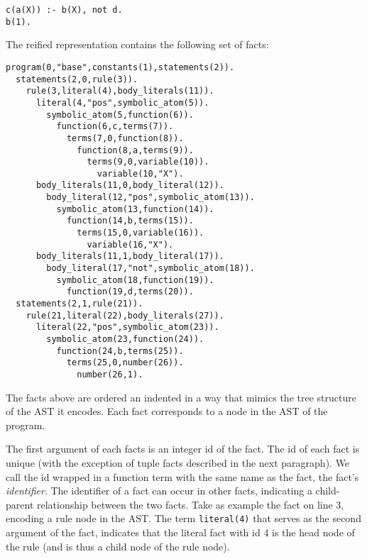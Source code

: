 \begin{lstlisting}[language=clingo]
c(a(X)) :- b(X), not d. 
b(1).
\end{lstlisting}

The reified representation contains the following set of facts:

\begin{lstlisting}[language=clingo]
program(0,"base",constants(1),statements(2)).
  statements(2,0,rule(3)).
    rule(3,literal(4),body_literals(11)).
      literal(4,"pos",symbolic_atom(5)).
        symbolic_atom(5,function(6)).
          function(6,c,terms(7)).
            terms(7,0,function(8)).
              function(8,a,terms(9)).
                terms(9,0,variable(10)).
                  variable(10,"X").
      body_literals(11,0,body_literal(12)).
        body_literal(12,"pos",symbolic_atom(13)).
          symbolic_atom(13,function(14)).
            function(14,b,terms(15)).
              terms(15,0,variable(16)).
                variable(16,"X").
      body_literals(11,1,body_literal(17)).
        body_literal(17,"not",symbolic_atom(18)).
          symbolic_atom(18,function(19)).
            function(19,d,terms(20)).
  statements(2,1,rule(21)).
    rule(21,literal(22),body_literals(27)).
      literal(22,"pos",symbolic_atom(23)).
        symbolic_atom(23,function(24)).
          function(24,b,terms(25)).
            terms(25,0,number(26)).
              number(26,1).
\end{lstlisting}

The facts above are ordered an indented in a way that mimics the tree
structure of the AST it encodes. Each fact corresponds to a node in
the AST of the program. 

The first argument of each facts is an integer id of the fact. The id
of each fact is unique (with the exception of tuple facts described in
the next paragraph). We call the id wrapped in a function term with the
same name as the fact, the fact's \emph{identifier}. The identifier of
a fact can occur in other facts, indicating a child-parent
relationship between the two facts.  Take as example the fact on line
3, encoding a rule node in the AST. The term \verb|literal(4)| that
serves as the second argument of the fact, indicates that the literal
fact with id 4 is the head node of the rule (and is thus a child node
of the rule node).

